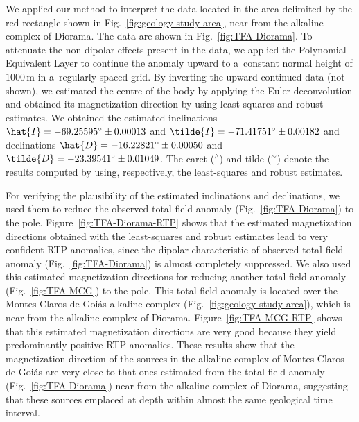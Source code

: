 \documentclass[journal abbreviation, npg]{copernicus}
\begin{document}
We applied our method to interpret the data located in the area delimited by
the red rectangle shown in Fig.~\ref{fig:geology-study-area}, near from the
alkaline complex of Diorama. The data are shown in
Fig.~\ref{fig:TFA-Diorama}. To attenuate the non-dipolar effects present in
the data, we applied the Polynomial Equivalent Layer
\citep{oliveirajr-etal2013} to continue the anomaly upward to a~constant
normal height of $1000$\,\unit{m} in a~regularly spaced grid. By inverting
the upward continued data (not shown), we estimated the centre of the body by
applying the Euler deconvolution and obtained its magnetization direction by
using least-squares and robust estimates. We obtained the estimated
inclinations $\hat{I} = -69.25595{\degree} \pm 0.00013${\degree} and
$\tilde{I} = -71.41751{\degree} \pm 0.00182${\degree} and declinations
$\hat{D} = -16.22821{\degree} \pm 0.00050${\degree} and $\tilde{D} =
-23.39541{\degree} \pm 0.01049${\degree}. The caret ($^{\wedge}$) and tilde
($^{\sim}$) denote the results computed by using, respectively, the
least-squares and robust estimates.

For verifying the plausibility of the estimated inclinations and
declinations, we used them to reduce the observed total-field anomaly
(Fig.~\ref{fig:TFA-Diorama}) to the pole. Figure~\ref{fig:TFA-Diorama-RTP}
shows that the estimated magnetization directions obtained with the
least-squares and robust estimates lead to very confident RTP anomalies,
since the dipolar characteristic of observed total-field anomaly
(Fig.~\ref{fig:TFA-Diorama}) is almost completely suppressed. We also used
this estimated magnetization directions for reducing another total-field
anomaly (Fig.~\ref{fig:TFA-MCG}) to the pole. This total-field anomaly is
located over the Montes Claros de Goi\'{a}s alkaline complex
(Fig.~\ref{fig:geology-study-area}), which is near from the alkaline complex
of Diorama. Figure~\ref{fig:TFA-MCG-RTP} shows that this estimated
magnetization directions are very good because they yield predominantly
positive RTP anomalies. These results show that the magnetization direction
of the sources in the alkaline complex of Montes Claros de Goi\'{a}s are very
close to that ones estimated from the total-field anomaly
(Fig.~\ref{fig:TFA-Diorama}) near from the alkaline complex of Diorama,
suggesting that these sources emplaced at depth within almost the same
geological time interval.
\end{document}

